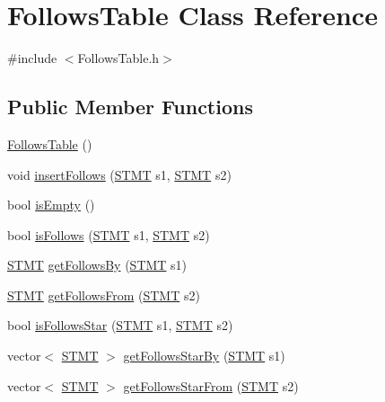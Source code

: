\hypertarget{class_follows_table}{\section{Follows\-Table Class Reference}
\label{class_follows_table}
}


{\ttfamily \#include $<$Follows\-Table.\-h$>$}

\subsection*{Public Member Functions}
\begin{DoxyCompactItemize}
\item 
\hyperlink{class_follows_table_a3f8037760cee7e5dc50a2df832f6c4ad}{Follows\-Table} ()
\item 
void \hyperlink{class_follows_table_a7bea1745b1f8b37e9ed96f5159116b8b}{insert\-Follows} (\hyperlink{std_afx_8h_a4a876b28ac3f59cecb39c2d2d76e4e7a}{S\-T\-M\-T} s1, \hyperlink{std_afx_8h_a4a876b28ac3f59cecb39c2d2d76e4e7a}{S\-T\-M\-T} s2)
\item 
bool \hyperlink{class_follows_table_a0eaf7b1c70730a6f658be07d1c6d60c4}{is\-Empty} ()
\item 
bool \hyperlink{class_follows_table_abe6692baa87cd5982996dd33400db8c1}{is\-Follows} (\hyperlink{std_afx_8h_a4a876b28ac3f59cecb39c2d2d76e4e7a}{S\-T\-M\-T} s1, \hyperlink{std_afx_8h_a4a876b28ac3f59cecb39c2d2d76e4e7a}{S\-T\-M\-T} s2)
\item 
\hyperlink{std_afx_8h_a4a876b28ac3f59cecb39c2d2d76e4e7a}{S\-T\-M\-T} \hyperlink{class_follows_table_aac4f2858b050a35ae0b351d5d2baee7b}{get\-Follows\-By} (\hyperlink{std_afx_8h_a4a876b28ac3f59cecb39c2d2d76e4e7a}{S\-T\-M\-T} s1)
\item 
\hyperlink{std_afx_8h_a4a876b28ac3f59cecb39c2d2d76e4e7a}{S\-T\-M\-T} \hyperlink{class_follows_table_a66ba94980e93271d5a99efe43915db76}{get\-Follows\-From} (\hyperlink{std_afx_8h_a4a876b28ac3f59cecb39c2d2d76e4e7a}{S\-T\-M\-T} s2)
\item 
bool \hyperlink{class_follows_table_ad68f64135cb00d8a29919bd924519fc6}{is\-Follows\-Star} (\hyperlink{std_afx_8h_a4a876b28ac3f59cecb39c2d2d76e4e7a}{S\-T\-M\-T} s1, \hyperlink{std_afx_8h_a4a876b28ac3f59cecb39c2d2d76e4e7a}{S\-T\-M\-T} s2)
\item 
vector$<$ \hyperlink{std_afx_8h_a4a876b28ac3f59cecb39c2d2d76e4e7a}{S\-T\-M\-T} $>$ \hyperlink{class_follows_table_a016f03c806ce676c62b51c623d549659}{get\-Follows\-Star\-By} (\hyperlink{std_afx_8h_a4a876b28ac3f59cecb39c2d2d76e4e7a}{S\-T\-M\-T} s1)
\item 
vector$<$ \hyperlink{std_afx_8h_a4a876b28ac3f59cecb39c2d2d76e4e7a}{S\-T\-M\-T} $>$ \hyperlink{class_follows_table_ab77cdda2c13684c54934884161a673c3}{get\-Follows\-Star\-From} (\hyperlink{std_afx_8h_a4a876b28ac3f59cecb39c2d2d76e4e7a}{S\-T\-M\-T} s2)
\end{DoxyCompactItemize}



